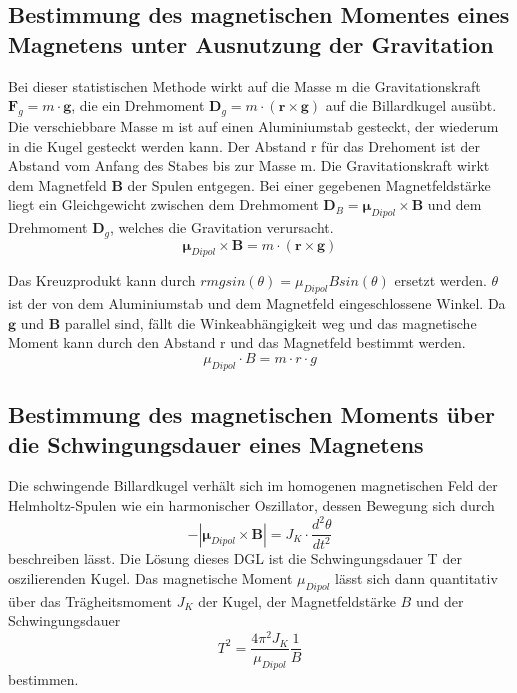\subsection{Bestimmung des magnetischen Momentes eines Magnetens unter Ausnutzung der Gravitation}
\label{sec:Gravitation}
Bei dieser statistischen Methode wirkt auf die Masse m die Gravitationskraft $\symbf{F}_g = m \cdot \symbf{g}$,
die ein Drehmoment $\symbf{D}_g = m \cdot (\symbf{r} \times \symbf{g})$ auf die Billardkugel ausübt.
Die verschiebbare Masse m ist auf einen Aluminiumstab gesteckt, der wiederum in die Kugel gesteckt werden kann.
Der Abstand r für das Drehoment ist der Abstand vom Anfang des Stabes bis zur Masse m.
Die Gravitationskraft wirkt dem Magnetfeld $\symbf{B}$ der Spulen entgegen.
Bei einer gegebenen Magnetfeldstärke liegt ein Gleichgewicht zwischen dem Drehmoment $\symbf{D}_B = \symbf{\mu}_{Dipol} \times \symbf{B}$ und dem Drehmoment $\symbf{D}_g$,
welches die Gravitation verursacht.
\begin{equation}
    \symbf{\mu}_{Dipol} \times \symbf{B} = m \cdot (\symbf{r} \times \symbf{g})
\end{equation}

Das Kreuzprodukt kann durch $ r m g sin(\theta) = \mu_{Dipol} B sin(\theta)$ ersetzt werden.
$\theta$ ist der von dem Aluminiumstab und dem Magnetfeld eingeschlossene Winkel.
Da $\symbf{g}$ und $\symbf{B}$ parallel sind, fällt die Winkeabhängigkeit weg und das magnetische Moment kann durch den Abstand r und das Magnetfeld bestimmt werden.
\begin{equation}
    \mu_{Dipol} \cdot B = m \cdot r \cdot g
    \label{eqn:gravitation}
\end{equation}


\subsection{Bestimmung des magnetischen Moments über die Schwingungsdauer eines Magnetens}
\label{sec:Schwingungsdauer}
Die schwingende Billardkugel verhält sich im homogenen magnetischen Feld der Helmholtz-Spulen wie ein harmonischer Oszillator,
dessen Bewegung sich durch
\begin{equation}
    -|\symbf{\mu}_{Dipol} \times \symbf{B}| = J_K \cdot \frac{d^2\theta}{dt^2}
\end{equation}
beschreiben lässt. Die Lösung dieses DGL ist die Schwingungsdauer T der oszilierenden Kugel.
Das magnetische Moment $\mu_{Dipol}$ lässt sich dann quantitativ über das Trägheitsmoment $J_K$ der Kugel,
der Magnetfeldstärke $B$ und der Schwingungsdauer
\begin{equation}
    T^2 = \frac{4 \pi^2 J_K}{\mu_{Dipol}} \frac{1}{B}
\end{equation}
bestimmen.

